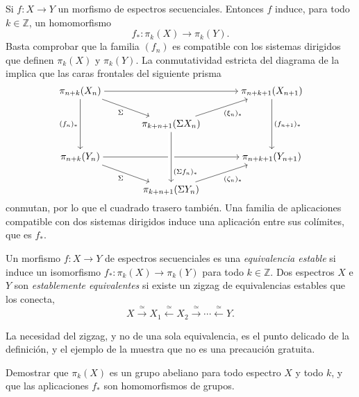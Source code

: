 Si $f\colon X\to Y$ un morfismo de espectros secuenciales. Entonces $f$ induce, para todo $k\in\mathbb Z$, un homomorfismo
\[
f_*\colon\pi_k(X)\longrightarrow\pi_k(Y).
\]
Basta comprobar que la familia $(f_n)$ es compatible con los sistemas dirigidos que definen $\pi_k(X)$ y $\pi_k(Y)$. La conmutatividad estricta del diagrama de la  implica que las caras frontales del siguiente prisma
\[\begin{tikzcd}[cramped,column sep=large]
	{\pi_{n+k}(X_n)} && {\pi_{n+k+1}(X_{n+1})} \\
	& {\pi_{k+n+1}(\Sigma X_n)} \\
	{\pi_{n+k}(Y_n)} && {\pi_{n+k+1}(Y_{n+1})} \\
	& {\pi_{k+n+1}(\Sigma Y_n)}
	\arrow[from=1-1, to=1-3]
	\arrow["{\Sigma}"', from=1-1, to=2-2]
	\arrow["{(f_n)_*}"', from=1-1, to=3-1]
	\arrow["{(f_{n+1})_*}", from=1-3, to=3-3]
	\arrow["{(\xi_n)_*}"', from=2-2, to=1-3]
    \arrow[from=3-1, to=3-3]
	\arrow["(\Sigma f_n)_*"{pos=0.8},from=2-2, to=4-2, crossing over]
	\arrow["{\Sigma}"', from=3-1, to=4-2]
	\arrow["{(\zeta_n)_*}"', from=4-2, to=3-3]
\end{tikzcd}\]
conmutan, por lo que el cuadrado trasero también. Una familia de aplicaciones compatible con dos sistemas dirigidos induce una aplicación entre sus colímites, que es $f_*$. \qedhere

\begin{defi}\label{defi:equiv-estable}
Un morfismo $f\colon X\to Y$ de espectros secuenciales es una \emph{equivalencia estable} si induce un isomorfismo $f_*\colon\pi_k(X)\to\pi_k(Y)$ para todo $k\in\mathbb Z$. Dos espectros $X$ e $Y$ son \emph{establemente equivalentes} si existe un zigzag de equivalencias estables que los conecta,
\[
X\xrightarrow{\ \simeq\ }X_1\xleftarrow{\ \simeq\ }X_2\xrightarrow{\ \simeq\ }\cdots\xleftarrow{\ \simeq\ }Y .
\]
\end{defi}

La necesidad del zigzag, y no de una sola equivalencia, es el punto delicado de la definición, y el ejemplo de la  muestra que no es una precaución gratuita.

\begin{ejer}\label{ejer:pi-abeliano}
Demostrar que $\pi_k(X)$ es un grupo abeliano para todo espectro $X$ y todo $k$, y que las aplicaciones $f_*$ son homomorfismos de grupos.
\end{ejer}

